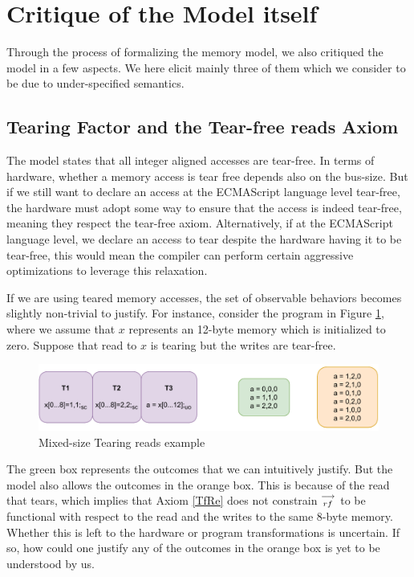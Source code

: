 \section{Critique of the Model itself}

    Through the process of formalizing the memory model, we also critiqued the model in a few aspects. 
    We here elicit mainly three of them which we consider to be due to under-specified semantics.

    \subsection{Tearing Factor and the Tear-free reads Axiom}

        The model states that all integer aligned accesses are tear-free.  
        In terms of hardware, whether a memory access is tear free depends also on the bus-size.
        But if we still want to declare an access at the ECMAScript language level tear-free, the hardware must adopt some way to ensure that the access is indeed tear-free, meaning they respect the tear-free axiom.
        Alternatively, if at the ECMAScript language level, we declare an access to tear despite the hardware having it to be tear-free, this would mean the compiler can perform certain aggressive optimizations to leverage this relaxation. 

        If we are using teared memory accesses, the set of observable behaviors becomes slightly non-trivial to justify.
        For instance, consider the program in Figure \ref{crit:tearing}, where we assume that $x$ represents an 12-byte memory which is initialized to zero. 
        Suppose that read to $x$ is tearing but the writes are tear-free.
        \begin{figure}[H]
            \centering
            \includegraphics[scale=0.7]{6.ConclusionFutureWork/TearingExample.pdf}
            \caption{Mixed-size Tearing reads example}
            \label{crit:tearing}
        \end{figure}

        The green box represents the outcomes that we can intuitively justify.
        But the model also allows the outcomes in the orange box. 
        This is because of the read that tears, which implies that Axiom \ref{TfRe} does not constrain $\stackrel{\longrightarrow}{_{rf}}$ to be functional with respect to the read and the writes to the same 8-byte memory. 
        Whether this is left to the hardware or program transformations is uncertain.
        If so, how could one justify any of the outcomes in the orange box is yet to be understood by us. 

